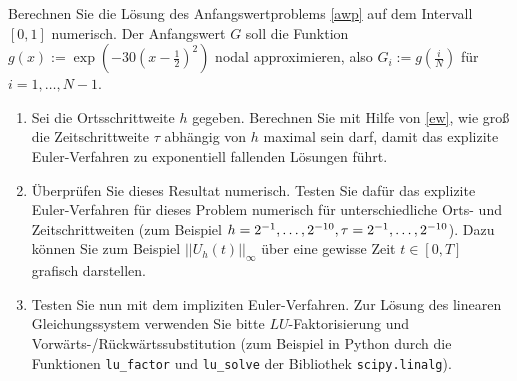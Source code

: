 \begin{exercise}
Berechnen Sie die Lösung des Anfangswertproblems \eqref{awp} auf dem Intervall
$[0,1]$ numerisch. Der Anfangswert $G$ soll die Funktion
$g(x) := \exp\left(-30\left(x-\frac{1}{2}\right)^2\right)$ nodal approximieren, also
$G_i := g\left(\frac{i}{N}\right)$ für $i = 1,\dots,N-1$.
\begin{enumerate}[label = \textbf{\alph*)}]
  \item Sei die Ortsschrittweite $h$ gegeben. Berechnen Sie mit Hilfe von \eqref{ew},
  wie groß die Zeitschrittweite $\tau$ abhängig von $h$ maximal sein darf, damit
  das explizite Euler-Verfahren zu exponentiell fallenden Lösungen führt.
  \item Überprüfen Sie dieses Resultat numerisch. Testen Sie dafür das explizite
  Euler-Verfahren für dieses Problem numerisch für unterschiedliche Orts- und
  Zeitschrittweiten (zum Beispiel $h = 2^{-1},\dots,2^{-10}, \\
  \tau = 2^{-1},\dots,2^{-10}$).
  Dazu können Sie zum Beispiel $||U_h(t)||_{\infty}$ über eine gewisse Zeit $t \in [0,T]$
  grafisch darstellen.
  \item Testen Sie nun mit dem impliziten Euler-Verfahren. Zur Lösung des linearen
  Gleichungssystem verwenden Sie bitte $LU$-Faktorisierung und Vorwärts-/Rückwärtssubstitution
  (zum Beispiel in Python durch die Funktionen \texttt{lu\_factor} und
  \texttt{lu\_solve} der
  Bibliothek \texttt{scipy.linalg}).
\end{enumerate}
\end{exercise}

